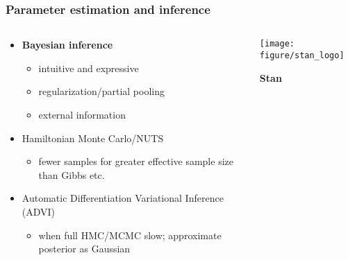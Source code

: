 \documentclass{beamer}
\begin{document}
\begin{frame}
  \frametitle{Parameter estimation and inference}
  \begin{columns}
    \begin{column}{0.45\textwidth}
      \begin{itemize}
        \item \textbf{Bayesian inference}
          \begin{itemize}
            \item intuitive and expressive
            \item regularization/partial pooling
            \item external information
          \end{itemize}
        \item Hamiltonian Monte Carlo/NUTS
          \begin{itemize}
            \item fewer samples for greater effective sample size than Gibbs etc.
          \end{itemize}
        \item Automatic Differentiation Variational Inference (ADVI)
          \begin{itemize}
            \item when full HMC/MCMC slow; approximate posterior as Gaussian
          \end{itemize}
      \end{itemize}
    \end{column}
    \begin{column}{0.55\textwidth}
      \begin{center}
        \texttt{[image: figure/stan\_logo]}

        \vspace*{0.05\textheight}

        \LARGE{\textbf{Stan}}
      \end{center}
    \end{column}
  \end{columns}
\end{frame}



%
\end{document}

